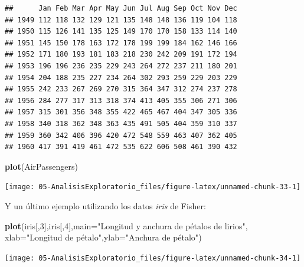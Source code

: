 \documentclass[]{book}
\newenvironment{Shaded}{\begin{snugshade}}{\end{snugshade}}
\newcommand{\DataTypeTok}[1]{\textcolor[rgb]{0.13,0.29,0.53}{#1}}
\newcommand{\DecValTok}[1]{\textcolor[rgb]{0.00,0.00,0.81}{#1}}
\newcommand{\KeywordTok}[1]{\textcolor[rgb]{0.13,0.29,0.53}{\textbf{#1}}}
\newcommand{\NormalTok}[1]{#1}
\newcommand{\StringTok}[1]{\textcolor[rgb]{0.31,0.60,0.02}{#1}}
\begin{document}
\begin{verbatim}
##      Jan Feb Mar Apr May Jun Jul Aug Sep Oct Nov Dec
## 1949 112 118 132 129 121 135 148 148 136 119 104 118
## 1950 115 126 141 135 125 149 170 170 158 133 114 140
## 1951 145 150 178 163 172 178 199 199 184 162 146 166
## 1952 171 180 193 181 183 218 230 242 209 191 172 194
## 1953 196 196 236 235 229 243 264 272 237 211 180 201
## 1954 204 188 235 227 234 264 302 293 259 229 203 229
## 1955 242 233 267 269 270 315 364 347 312 274 237 278
## 1956 284 277 317 313 318 374 413 405 355 306 271 306
## 1957 315 301 356 348 355 422 465 467 404 347 305 336
## 1958 340 318 362 348 363 435 491 505 404 359 310 337
## 1959 360 342 406 396 420 472 548 559 463 407 362 405
## 1960 417 391 419 461 472 535 622 606 508 461 390 432
\end{verbatim}

\begin{Shaded}
\begin{Highlighting}[]
\KeywordTok{plot}\NormalTok{(AirPassengers)}
\end{Highlighting}
\end{Shaded}

\begin{center}\texttt{[image: 05-AnalisisExploratorio\_files/figure-latex/unnamed-chunk-33-1]} \end{center}

Y un último ejemplo utilizando los datos \emph{iris} de Fisher:

\begin{Shaded}
\begin{Highlighting}[]
\KeywordTok{plot}\NormalTok{(iris[,}\DecValTok{3}\NormalTok{],iris[,}\DecValTok{4}\NormalTok{],}\DataTypeTok{main=}\StringTok{"Longitud y anchura de pétalos de lirios"}\NormalTok{,}
     \DataTypeTok{xlab=}\StringTok{"Longitud de pétalo"}\NormalTok{,}\DataTypeTok{ylab=}\StringTok{"Anchura de pétalo"}\NormalTok{)}
\end{Highlighting}
\end{Shaded}

\begin{center}\texttt{[image: 05-AnalisisExploratorio\_files/figure-latex/unnamed-chunk-34-1]} \end{center}
\end{document}

